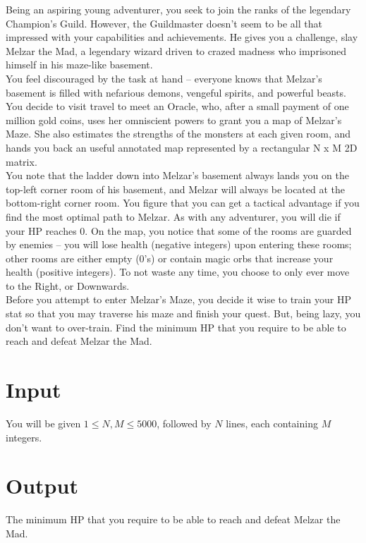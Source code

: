 
Being an aspiring young adventurer, you seek to join the ranks of the legendary Champion’s Guild. However, the Guildmaster doesn’t seem to be
all that impressed with your capabilities and achievements. He gives you a challenge, slay Melzar the Mad, a legendary wizard driven to crazed
madness who imprisoned himself in his maze-like basement. \\

You feel discouraged by the task at hand – everyone knows that Melzar’s basement is filled with nefarious demons, vengeful 
spirits, and powerful beasts. You decide to visit travel to meet an Oracle, who, after a small payment of one million gold coins, uses
her omniscient powers to grant you a map of Melzar’s Maze. She also estimates the strengths of the monsters at each
given room, and hands you back an useful annotated map represented by a rectangular N x M 2D matrix. \\

You note that the ladder down into Melzar's basement always lands you on the top-left corner room of his basement, and
Melzar will always be located at the bottom-right corner room. You figure that you can get a tactical advantage if you find the most optimal
path to Melzar. As with any adventurer, you will die if your HP reaches 0. On the map, you notice that some of the rooms are guarded by enemies –
you will lose health (negative integers) upon entering these rooms; other rooms are either empty (0's) or contain magic
orbs that increase your health (positive integers). To not waste any time, you choose to only ever move to the Right, or Downwards. \\

Before you attempt to enter Melzar’s Maze, you decide it wise to train your HP stat so that you may traverse his maze and finish your quest.
But, being lazy, you don’t want to over-train. Find the minimum HP that you require to be able to reach and defeat
Melzar the Mad.

\section*{Input}
You will be given $1 \leq N,M \leq 5000$, followed by $N$ lines, each containing $M$  integers.
\section*{Output}
The minimum HP that you require to be able to reach and defeat Melzar the Mad.
